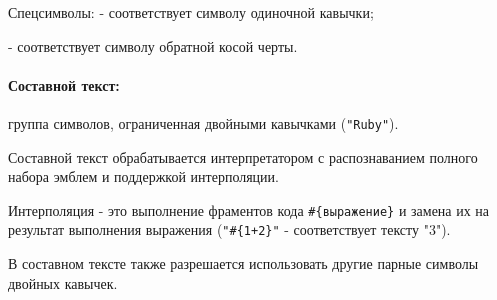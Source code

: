 \begin{keylist}{Спецсимволы:}  
   - соответствует символу одиночной кавычки;
  
  \key{\textbackslash} - соответствует символу обратной косой черты.
\end{keylist}
  
\paragraph*{Составной текст:} группа символов, ограниченная двойными кавычками (\verb!"Ruby"!). 

Составной текст обрабатывается интерпретатором с распознаванием полного набора эмблем и поддержкой интерполяции.

Интерполяция - это выполнение фраментов кода \verb!#{выражение}! и замена их на результат выполнения выражения (\verb!"#{1+2}"! - соответствует тексту "3"). 

В составном тексте также разрешается использовать другие парные символы двойных кавычек.

